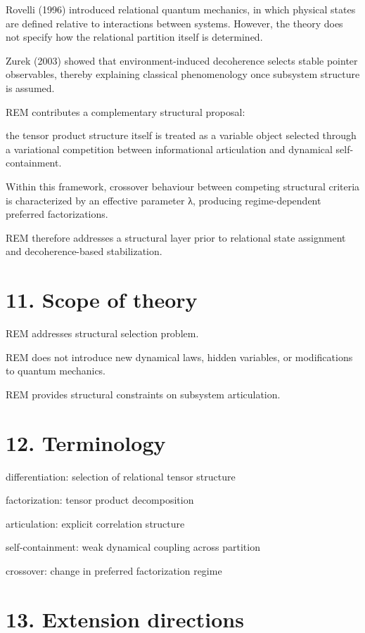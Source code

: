 \documentclass[
]{article}
\begin{document}
Rovelli (1996) introduced relational quantum mechanics, in which physical states are defined relative to interactions between systems. However, the theory does not specify how the relational partition itself is determined.

Zurek (2003) showed that environment-induced decoherence selects stable pointer observables, thereby explaining classical phenomenology once subsystem structure is assumed.

REM contributes a complementary structural proposal:

the tensor product structure itself is treated as a variable object selected through a variational competition between informational articulation and dynamical self-containment.

Within this framework, crossover behaviour between competing structural criteria is characterized by an effective parameter λ, producing regime-dependent preferred factorizations.

REM therefore addresses a structural layer prior to relational state assignment and decoherence-based stabilization.

\section{11. Scope of theory}\label{scope-of-theory}

REM addresses structural selection problem.

REM does not introduce new dynamical laws, hidden variables, or
modifications to quantum mechanics.

REM provides structural constraints on subsystem articulation.

\section{12. Terminology}\label{terminology}

differentiation: selection of relational tensor structure

factorization: tensor product decomposition

articulation: explicit correlation structure

self-containment: weak dynamical coupling across partition

crossover: change in preferred factorization regime

\section{13. Extension directions}\label{extension-directions}
\end{document}

